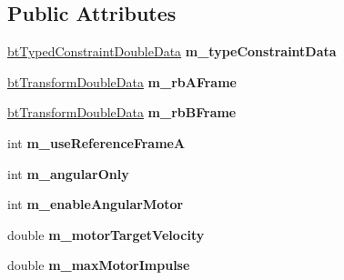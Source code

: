 \subsection*{Public Attributes}
\begin{DoxyCompactItemize}
\item 
\mbox{\label{structbtHingeConstraintDoubleData2_a563716fbe3415eed683e3f00ac1b6390}} 
\hyperlink{structbtTypedConstraintDoubleData}{bt\+Typed\+Constraint\+Double\+Data} {\bfseries m\+\_\+type\+Constraint\+Data}
\item 
\mbox{\label{structbtHingeConstraintDoubleData2_af0ab59953f4bed86bd5b822a897cfa88}} 
\hyperlink{structbtTransformDoubleData}{bt\+Transform\+Double\+Data} {\bfseries m\+\_\+rb\+A\+Frame}
\item 
\mbox{\label{structbtHingeConstraintDoubleData2_ae4f34bb9dd0dd163baec091d54757d55}} 
\hyperlink{structbtTransformDoubleData}{bt\+Transform\+Double\+Data} {\bfseries m\+\_\+rb\+B\+Frame}
\item 
\mbox{\label{structbtHingeConstraintDoubleData2_a9c216ca42a01edbd8c34480eaaef60fc}} 
int {\bfseries m\+\_\+use\+Reference\+FrameA}
\item 
\mbox{\label{structbtHingeConstraintDoubleData2_ab215402aff27aec67ce842dbe43d0f9d}} 
int {\bfseries m\+\_\+angular\+Only}
\item 
\mbox{\label{structbtHingeConstraintDoubleData2_a63297b2772ce68b4d7688ace6ce0444e}} 
int {\bfseries m\+\_\+enable\+Angular\+Motor}
\item 
\mbox{\label{structbtHingeConstraintDoubleData2_a513db50b076c99376e35560f6747b689}} 
double {\bfseries m\+\_\+motor\+Target\+Velocity}
\item 
\mbox{\label{structbtHingeConstraintDoubleData2_a260daee144bc2495247c9c97f8feb97c}} 
double {\bfseries m\+\_\+max\+Motor\+Impulse}
\item 
\mbox{\label{structbtHingeConstraintDoubleData2_adf997d0dfd642bba6bb0d63977002d71}} 

\end{DoxyCompactItemize}

